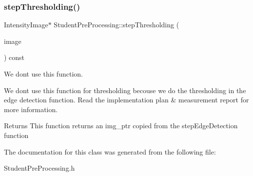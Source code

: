 \subsubsection{\texorpdfstring{step\+Thresholding()}{stepThresholding()}}
{\footnotesize\ttfamily Intensity\+Image$\ast$ Student\+Pre\+Processing\+::step\+Thresholding (\begin{DoxyParamCaption}\item[{const Intensity\+Image \&}]{image }\end{DoxyParamCaption}) const}



We don\textquotesingle{}t use this function. 

We don\textquotesingle{}t use this function for thresholding becouse we do the thresholding in the edge detection function. Read the implementation plan \& measurement report for more information.

\begin{DoxyReturn}{Returns}
This function returns an img\+\_\+ptr copied from the step\+Edge\+Detection function 
\end{DoxyReturn}


The documentation for this class was generated from the following file\+:\begin{DoxyCompactItemize}
\item 
Student\+Pre\+Processing.\+h\end{DoxyCompactItemize}
